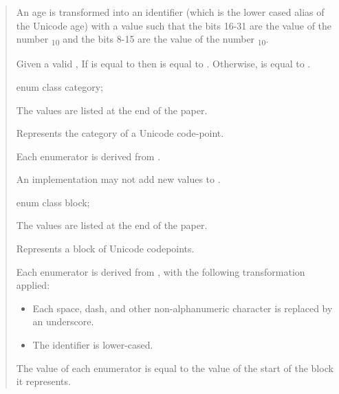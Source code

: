 \documentclass{wg21}
\begin{document}
\begin{quote}
\begin{itemdescr}
An age  is transformed into an identifier  (which is the lower cased alias of the Unicode age) with a value such that the bits 16-31 are the value of the number \textsubscript{10} and the bits 8-15
are the value of the number \textsubscript{10}.

\end{itemdescr}

Given a valid  ,  If  is equal to  then  is equal to .
Otherwise,  is equal to .


\begin{itemdecl}
enum class category;

\end{itemdecl}

The values are listed at the end of the paper.

\begin{itemdescr}

Represents the category of a Unicode code-point.

Each enumerator is derived from \cite{PropertyValueAliases}.

\begin{note}
    An implementation may not add new values to .
\end{note}

\end{itemdescr}

\begin{itemdecl}
enum class block;
\end{itemdecl}

The values are listed at the end of the paper.

\begin{itemdescr}

Represents a block of Unicode codepoints.

Each enumerator is derived from \cite{PropertyValueAliases}, with the following transformation applied:
\begin{itemize}
    \item Each space, dash, and other non-alphanumeric character is replaced by an underscore.
    \item The identifier is lower-cased.
\end{itemize}

The value of each enumerator is equal to the value of the start of the block it represents.


\end{itemdescr}
\end{quote}
\end{document}
